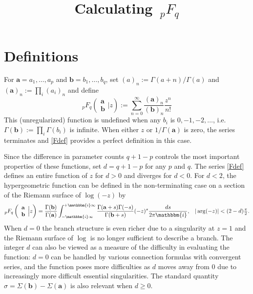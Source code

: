 \documentclass[12pt]{article}
\author{}
\title{Calculating $\, _{p}F_{q}$}
\date{}
\newcommand{\ii}[0] {\mathbbm{i}}
\numberwithin{equation}{section}
\newcommand{\FF}[6] {{}_{#1}{#2}_{#3} \left( \begin{array}{c} #4 \\ #5 \end{array} \Big| {#6}  \right)}
\newcommand{\FFf}[5] {{}_{#1}{#2}_{#3} \left(#4 | {#5} \right)}
\newcommand{\bfa}[0] {\mathbf{a}}
\newcommand{\bfb}[0] {\mathbf{b}}
\begin{document}



\section{Definitions}
For $\mathbf{a}=a_1,\dots,a_p$ and  $\mathbf{b}=b_1,\dots,b_q$, set $(a)_n := \Gamma(a+n)/\Gamma(a)$ and $(\mathbf{a})_n := \prod_i (a_i)_n$ and define
\begin{equation}
\label{Fdef}
\FF{p}{F}{q}{\mathbf{a}}{\mathbf{b}}{z} := \sum_{n=0}^{\infty} \frac{(\mathbf{a})_n}{(\mathbf{b})_n} \frac{z^n}{n!}
\end{equation}
This (unregularized) function is undefined when any $b_i$ is $0,-1,-2,\dots$, i.e. $\Gamma(\mathbf{b}) := \prod_i \Gamma(b_i)$ is infinite. When either $z$ or $1/\Gamma(\bfa)$ is zero, the series terminates and \eqref{Fdef} provides a perfect definition in this case.

Since the difference in parameter counts $q+1-p$ controls the most important properties of these functions, set $d=q+1-p$ for any $p$ and $q$. The series \eqref{Fdef} defines an entire function of $z$ for $d > 0$ and diverges for $d<0$. For $d<2$, the hypergeometric function can be defined in the non-terminating case on a section of the Riemann surface of $\log(-z)$ by
\begin{equation}
\label{mbint}
\FF{p}{F}{q}{\mathbf{a}}{\mathbf{b}}{z} = \frac{\Gamma(\mathbf{b})}{\Gamma(\mathbf{a})} \int_{-\ii \infty}^{+\ii \infty} \frac{\Gamma(\mathbf{a}+s) \Gamma(-s)}{\Gamma(\mathbf{b}+s)} (-z)^s \frac{ds}{2\pi \ii}\text{,} \quad |\arg(-z)| < (2-d) \tfrac{\pi}{2}\text{.}
\end{equation}
When $d=0$ the branch structure is even richer due to a singularity at $z=1$ and the Riemann surface of $\log$ is no longer sufficient to describe a branch. The integer $d$ can also be viewed as a measure of the difficulty in evaluating the function: $d=0$ can be handled by various connection formulas with convergent series, and the function poses more difficulties as $d$ moves away from $0$ due to increasingly more difficult essential singularities. The standard quantity
$\sigma = \Sigma(\mathbf{b}) - \Sigma(\mathbf{a})$ is also relevant when $d \ge 0$.
\end{document}
